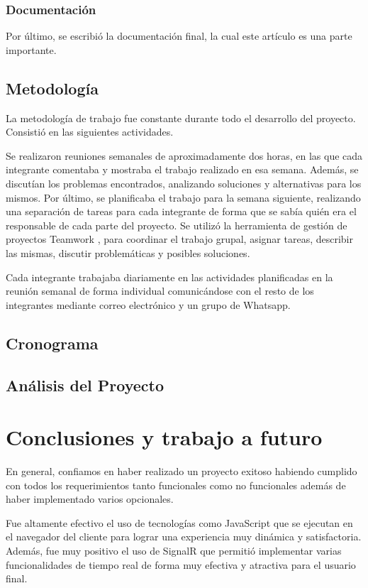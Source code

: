 \documentclass[journal]{IEEEtran}
\begin{document}
\subsubsection{Documentación}
Por último, se escribió la documentación final, la cual este artículo es una parte importante.


\subsection{Metodología}
La metodología de trabajo fue constante durante todo el desarrollo del proyecto. Consistió en las siguientes actividades.

Se realizaron reuniones semanales de aproximadamente dos horas, en las que cada integrante comentaba y mostraba el trabajo realizado en esa semana. Además, se discutían los problemas encontrados, analizando soluciones y alternativas para los mismos. Por último, se planificaba el trabajo para la semana siguiente, realizando una separación de tareas para cada integrante de forma que se sabía quién era el responsable de cada parte del proyecto. Se utilizó la herramienta de gestión de proyectos Teamwork \cite{url:teamwork}, para coordinar el trabajo grupal, asignar tareas, describir las mismas, discutir problemáticas y posibles soluciones.

Cada integrante trabajaba diariamente en las actividades planificadas en la reunión semanal de forma individual comunicándose con el resto de los integrantes mediante correo electrónico y un grupo de Whatsapp.

\subsection{Cronograma}

\subsection{Análisis del Proyecto}

\section{Conclusiones y trabajo a futuro}
En general, confiamos en haber realizado un proyecto exitoso habiendo cumplido con todos los requerimientos tanto funcionales como no funcionales además de haber implementado varios opcionales.

Fue altamente efectivo el uso de tecnologías como JavaScript que se ejecutan en el navegador del cliente para lograr una experiencia muy dinámica y satisfactoria. Además, fue muy positivo el uso de SignalR que permitió implementar varias funcionalidades de tiempo real de forma muy efectiva y atractiva para el usuario final.
\end{document}
